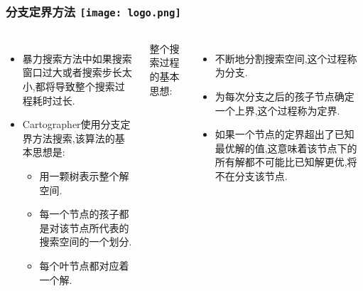 \begin{comment}

\end{comment}
\begin{frame}
\frametitle{分支定界方法 \hfill \texttt{[image: logo.png]}}
\begin{columns}
		
	\begin{itemize}
		\item 暴力搜索方法中如果搜索窗口过大或者搜索步长太小,都将导致整个搜索过程耗时过长.
		\item Cartographer使用分支定界方法搜索,该算法的基本思想是:
		\begin{itemize}
			\item 用一颗树表示整个解空间.%
			\item 每一个节点的孩子都是对该节点所代表的搜索空间的一个划分.
			\item 每个叶节点都对应着一个解.
		\end{itemize}
	\end{itemize}
	
	整个搜索过程的基本思想:
	\begin{itemize}
		\item 不断地分割搜索空间,这个过程称为{\color{red}分支}.
		\item 为每次分支之后的孩子节点确定一个上界,这个过程称为{\color{red}定界}.
		\item 如果一个节点的定界超出了已知最优解的值,这意味着该节点下的所有解都不可能比已知解更优,将不在分支该节点.
	\end{itemize}
\end{columns}

\end{frame}

